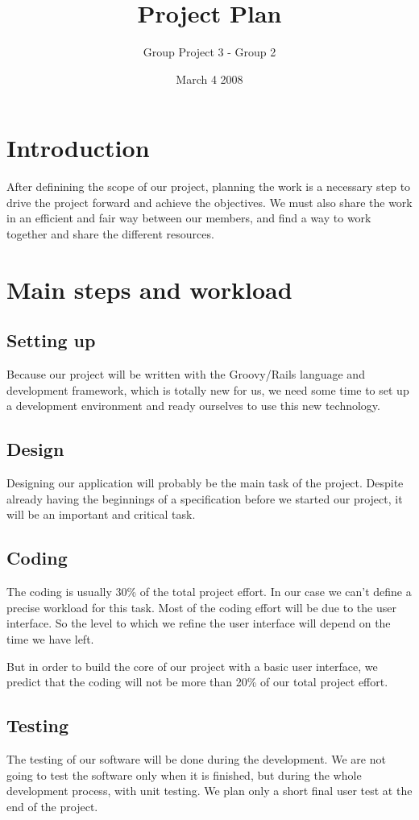 \documentclass[a4paper,12pt]{article}
\title{Project Plan}
\author{Group Project 3 - Group 2}
\date{March 4 2008}
\begin{document}
\maketitle
\newpage
\tableofcontents
\newpage

\section{Introduction}
After definining the scope of our project, planning the work is a necessary step to drive the project forward and achieve the objectives.
We must also share the work in an efficient and fair way between our members, and find a way to work together and share the different resources.

\section{Main steps and workload}
\subsection{Setting up}
Because our project will be written with the Groovy/Rails language and development framework, which is totally new for us,
we need some time to set up a development environment and ready ourselves to use this new technology.
\subsection{Design}
Designing our application will probably be the main task of the project.
Despite already having the beginnings of a specification before we started our project, it will be an important and critical task.
\subsection{Coding}
The coding is usually 30\% of the total project effort. In our case we can't define a precise workload for this task. Most of the coding effort will be due to the user interface.
So the level to which we refine the user interface will depend on the time we have left.

But in order to build the core of our project with a basic user interface, we predict that the coding will not be more than 20\% of our total project effort.
\subsection{Testing}
The testing of our software will be done during the development. We are not going to test the software only when it is finished, but during the whole development process, with unit testing.
We plan only a short final user test at the end of the project.
\end{document}

